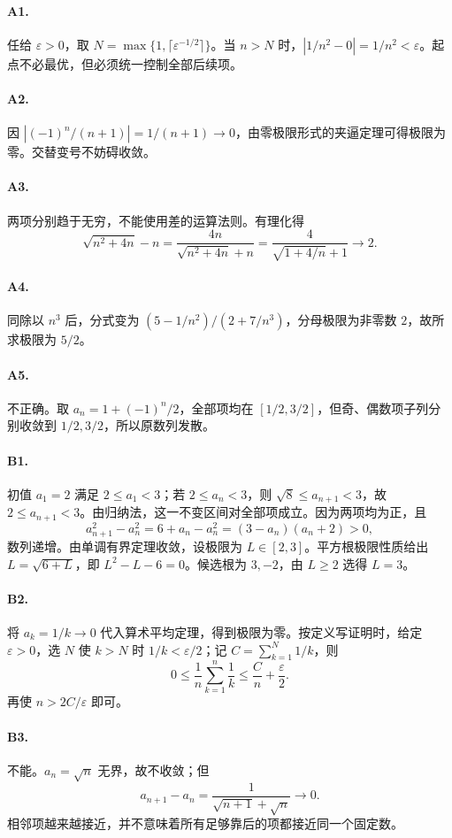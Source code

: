 \documentclass[UTF8,fontset=fandol,12pt,oneside,openany]{ctexrep}
\theoremstyle{definition}
\begin{document}
\paragraph{A1.} 任给 $\varepsilon>0$，取 $N=\max\{1,\lceil\varepsilon^{-1/2}\rceil\}$。当 $n>N$ 时，$|1/n^2-0|=1/n^2<\varepsilon$。起点不必最优，但必须统一控制全部后续项。
\paragraph{A2.} 因 $|(-1)^n/(n+1)|=1/(n+1)\to0$，由零极限形式的夹逼定理可得极限为零。交替变号不妨碍收敛。
\paragraph{A3.} 两项分别趋于无穷，不能使用差的运算法则。有理化得
\[
\sqrt{n^2+4n}-n=\frac{4n}{\sqrt{n^2+4n}+n}=\frac4{\sqrt{1+4/n}+1}\to2.
\]
\paragraph{A4.} 同除以 $n^3$ 后，分式变为 $(5-1/n^2)/(2+7/n^3)$，分母极限为非零数 $2$，故所求极限为 $5/2$。
\paragraph{A5.} 不正确。取 $a_n=1+(-1)^n/2$，全部项均在 $[1/2,3/2]$，但奇、偶数项子列分别收敛到 $1/2,3/2$，所以原数列发散。
\paragraph{B1.} 初值 $a_1=2$ 满足 $2\le a_1<3$；若 $2\le a_n<3$，则 $\sqrt8\le a_{n+1}<3$，故 $2\le a_{n+1}<3$。由归纳法，这一不变区间对全部项成立。因为两项均为正，且
\[
a_{n+1}^2-a_n^2=6+a_n-a_n^2=(3-a_n)(a_n+2)>0,
\]
数列递增。由单调有界定理收敛，设极限为 $L\in[2,3]$。平方根极限性质给出 $L=\sqrt{6+L}$，即 $L^2-L-6=0$。候选根为 $3,-2$，由 $L\ge2$ 选得 $L=3$。
\paragraph{B2.} 将 $a_k=1/k\to0$ 代入算术平均定理，得到极限为零。按定义写证明时，给定 $\varepsilon>0$，选 $N$ 使 $k>N$ 时 $1/k<\varepsilon/2$；记 $C=\sum_{k=1}^N1/k$，则
\[
0\le\frac1n\sum_{k=1}^n\frac1k\le\frac Cn+\frac\varepsilon2.
\]
再使 $n>2C/\varepsilon$ 即可。
\paragraph{B3.} 不能。$a_n=\sqrt n$ 无界，故不收敛；但
\[
a_{n+1}-a_n=\frac1{\sqrt{n+1}+\sqrt n}\to0.
\]
相邻项越来越接近，并不意味着所有足够靠后的项都接近同一个固定数。
\end{document}
